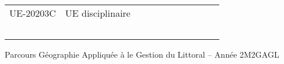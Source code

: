 \documentclass[a4paper,11pt]{article}
\begin{document}
{{\begin{tabular}{lllllllllll}
\rowcolor[HTML]{C0C0C0} 
UE-20203C                      & UE disciplinaire                                   &                           &                           &                           &                                    &                             &                             &                                    &                                  &                                  \\
                               &                                                    &                           &                           &                           &                                    &                             &                             &                                    &                                  &                                  \\
                               &                                                    &                           &                           &                           &                                    &                             &                             &                                    &                                  &                                  \\
                               &                                                    &                           &                           &                           &                                    &                             &                             &                                    &                                  &                                  \\
                               &                                                    &                           &                           &                           &                                    &                             &                             &                                    &                                  &                                  \\
                               &                                                    &                           &                           &                           &                                    &                             &                             &                                    &                                  &                                 
\end{tabular}
}
}{Parcours Géographie Appliquée à le Gestion du Littoral -- Année 2}{M2GAGL}
\end{document}

